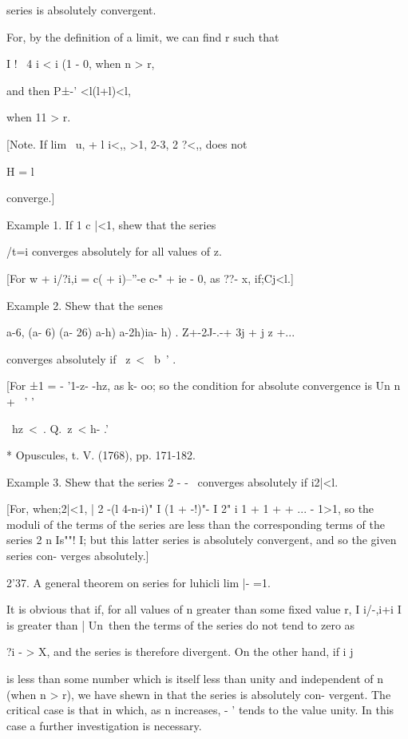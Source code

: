 series is absolutely convergent.

For, by the definition of a limit, we can find r such that

I ! \ 4 i < i (1 - 0, when n > r,

and then P±-' <l(l+l)<l,

when 11 > r.

[Note. If lim \ u, + l i<,, >1, %
2-3, 2 ?<,, does not

H = l

converge.]

Example 1. If 1 c |<1, shew that the series

/t=i converges absolutely for all values of z.

[For w + i/?i,i = c( + i)--''-e c-" + ie - 0, as ??- x, if;Cj<l.]

Example 2. Shew that the senes

a-6, (a- 6) (a- 26) a-h) a-2h)ia- h) . Z+-2J-.-+ 3j + j z +...

converges absolutely if \ z\ < \ b~' .

[For ±1 = - '1-z- -hz, as k- oo; so the condition for absolute
convergence is Un n + \ ' '

\ hz\ < \,. Q.\ z\ < h- .'\

* Opuscules, t. V. (1768), pp. 171-182.

%
%

Example 3. Shew that the series 2 - - \, converges absolutely if
i2|<l.

[For, when;2|<1, | 2 -(l 4-n-i)" I (1 + -!)"- I 2" i 1 + 1 + + ... -
1>1, so the moduli of the terms of the series are less than the
corresponding terms of the series 2 n Is""! I; but this latter series
is absolutely convergent, and so the given series con- verges
absolutely.]

2'37. A general theorem on series for luhicli lim |- =1.

It is obvious that if, for all values of n greater than some fixed
value r, I i/-,i+i I is greater than | Un\, then the terms of the
series do not tend to zero as

?i - > X, and the series is therefore divergent. On the other hand,
if i j

is less than some number which is itself less than unity and
independent of n (when n > r), we have shewn in that the series
is absolutely con- vergent. The critical case is that in which, as n
increases, - ' tends to the value unity. In this case a further
investigation is necessary.

